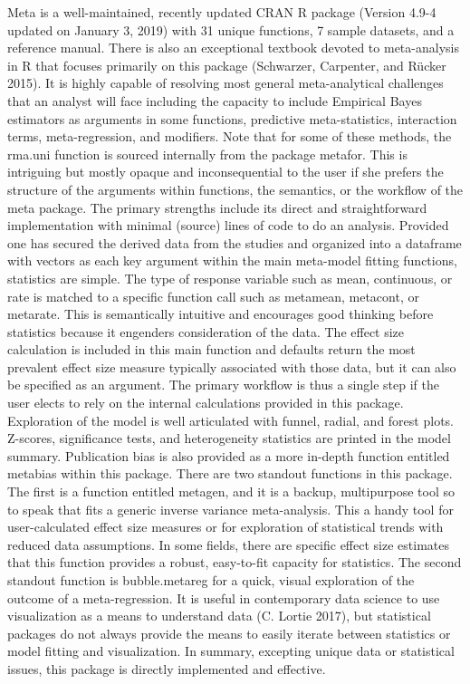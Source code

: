 \documentclass[fleqn,10pt]{wlpeerj} %
\begin{document}
Meta is a well-maintained, recently updated CRAN R package (Version
4.9-4 updated on January 3, 2019) with 31 unique functions, 7 sample
datasets, and a reference manual. There is also an exceptional textbook
devoted to meta-analysis in R that focuses primarily on this package
(Schwarzer, Carpenter, and Rücker 2015). It is highly capable of
resolving most general meta-analytical challenges that an analyst will
face including the capacity to include Empirical Bayes estimators as
arguments in some functions, predictive meta-statistics, interaction
terms, meta-regression, and modifiers. Note that for some of these
methods, the rma.uni function is sourced internally from the package
metafor. This is intriguing but mostly opaque and inconsequential to the
user if she prefers the structure of the arguments within functions, the
semantics, or the workflow of the meta package. The primary strengths
include its direct and straightforward implementation with minimal
(source) lines of code to do an analysis. Provided one has secured the
derived data from the studies and organized into a dataframe with
vectors as each key argument within the main meta-model fitting
functions, statistics are simple. The type of response variable such as
mean, continuous, or rate is matched to a specific function call such as
metamean, metacont, or metarate. This is semantically intuitive and
encourages good thinking before statistics because it engenders
consideration of the data. The effect size calculation is included in
this main function and defaults return the most prevalent effect size
measure typically associated with those data, but it can also be
specified as an argument. The primary workflow is thus a single step if
the user elects to rely on the internal calculations provided in this
package. Exploration of the model is well articulated with funnel,
radial, and forest plots. Z-scores, significance tests, and
heterogeneity statistics are printed in the model summary. Publication
bias is also provided as a more in-depth function entitled metabias
within this package. There are two standout functions in this package.
The first is a function entitled metagen, and it is a backup,
multipurpose tool so to speak that fits a generic inverse variance
meta-analysis. This a handy tool for user-calculated effect size
measures or for exploration of statistical trends with reduced data
assumptions. In some fields, there are specific effect size estimates
that this function provides a robust, easy-to-fit capacity for
statistics. The second standout function is bubble.metareg for a quick,
visual exploration of the outcome of a meta-regression. It is useful in
contemporary data science to use visualization as a means to understand
data (C. Lortie 2017), but statistical packages do not always provide
the means to easily iterate between statistics or model fitting and
visualization. In summary, excepting unique data or statistical issues,
this package is directly implemented and effective.
\end{document}

